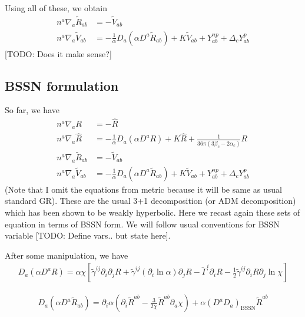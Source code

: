 \documentclass[a4paper,oneside,openany,11pt]{memoir}
\numberwithin{equation}{section} %
\newcommand{\TODO}[1]{{\color{red}[}{\color{red}TODO:} {\color{blue}#1}{\color{red}]}}
\begin{document}
Using all of these, we obtain
\begin{align}
n^a \nabla_a \tilde{R}_{ab} &= - \tilde{V}_{ab}  \\
n^a \nabla_a \tilde{V}_{ab} &= -  \frac{1}{\alpha} D_a (\alpha D^a \tilde{R}_{ab} ) + K \tilde{V}_{ab} + Y^{np}_{ab} + \Delta_c Y^{p}_{ab}
\end{align} 
\TODO{Does it make sense?}

\subsection{BSSN formulation}
So far, we have
\begin{align}
n^a \nabla_a R &= - \hat{R}  \\
n^a \nabla_a \hat{R} &= -  \frac{1}{\alpha} D_a (\alpha D^a R) + K \hat{R} + \frac{1}{36 \pi (3\beta_c - 2 \alpha_c)} R\\
n^a \nabla_a \tilde{R}_{ab} &= - \tilde{V}_{ab}  \\
n^a \nabla_a \tilde{V}_{ab} &= -  \frac{1}{\alpha} D_a (\alpha D^a \tilde{R}_{ab} ) + K \tilde{V}_{ab} + Y^{np}_{ab} + \Delta_c Y^{p}_{ab}
\end{align}
(Note that I omit the equations from metric because it will be same as usual standard GR). 
These are the usual 3+1 decomposition (or ADM decomposition) which has been shown to 
be weakly hyperbolic. Here we recast again these sets of equation in terms of BSSN form.
We will follow usual conventions for BSSN variable \TODO{Define vars.. but state here}.

After some manipulation, we have
\begin{align}
\label{eqn:bssn:inter1}
D_a ( \alpha D^a R) = \alpha \chi \left[\tilde{\gamma}^{ij} \partial_i \partial_j R + \tilde{\gamma}^{ij} (\partial_i  \ln \alpha) \partial_j R - \tilde{\Gamma}^i \partial_i R - \frac{1}{2} \tilde{\gamma}^{ij} \partial_i R \partial_j \ln \chi \right]
\end{align}

\begin{align}
\label{eqn:bssn:inter1}
D_a ( \alpha D^a \tilde{R}_{ab}) = \partial_i \alpha \left(\partial_i \tilde{R}^{ab} - \frac{3}{2\chi} \tilde{R}^{ab} \partial_a \chi \right) + \alpha (D^a D_a )_{\textrm{BSSN}} \tilde{R}^{ab}
\end{align}
\end{document}
